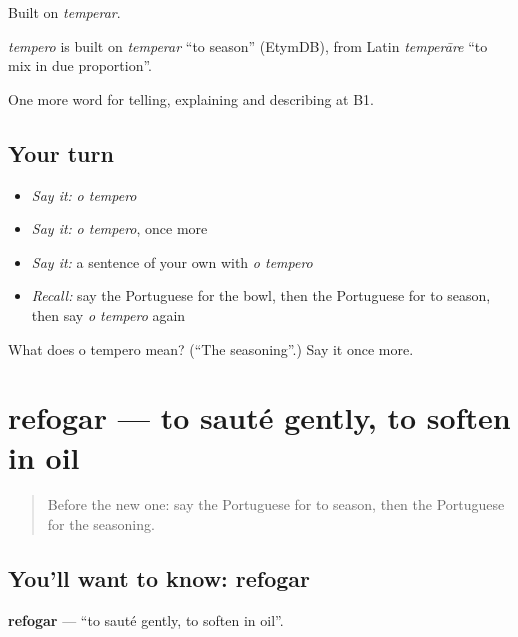 Built on \emph{temperar}.

\begin{cousinweb}
\emph{tempero} is built on \emph{temperar} \textquotedblleft{}to season\textquotedblright{} (EtymDB), from Latin \emph{temperāre} \textquotedblleft{}to mix in due proportion\textquotedblright{}.
\end{cousinweb}

\begin{grammarlens}[title={What you've built}]
One more word for telling, explaining and describing at B1.
\end{grammarlens}

\subsection*{Your turn}
\begin{itemize}
\raggedright
  \item \emph{Say it:} \emph{o tempero}
  \item \emph{Say it:} \emph{o tempero}, once more
  \item \emph{Say it:} a sentence of your own with \emph{o tempero}
  \item \emph{Recall:} say the Portuguese for the bowl, then the Portuguese for to season, then say \emph{o tempero} again
\end{itemize}

\begin{tcolorbox}[breakable,colback=teal!4,colframe=teal!35!black,title={Before you move on}]
What does o tempero mean? (\textquotedblleft{}The seasoning\textquotedblright{}.) Say it once more.
\end{tcolorbox}
\section[refogar]{refogar — to sauté gently, to soften in oil}

\label{lesson:PT-C331-refogar}



\begin{quote}
Before the new one: say the Portuguese for to season, then the Portuguese for the seasoning.
\end{quote}

\subsection*{You'll want to know: refogar}
\textbf{refogar} — \textquotedblleft{}to sauté gently, to soften in oil\textquotedblright{}.

